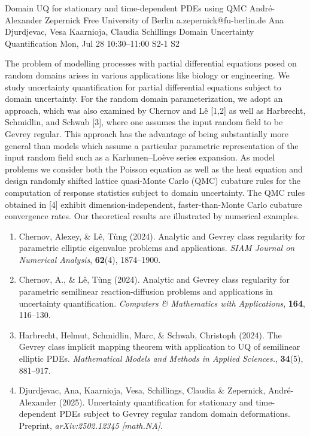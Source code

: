 \documentclass[12pt,lettersize,oneside]{book} %
\begin{document}
\begin{talk}
  {Domain UQ for stationary and time-dependent PDEs using QMC}%
  {Andr\'e-Alexander Zepernick}%
  {Free University of Berlin}%
  {a.zepernick@fu-berlin.de}%
  {Ana Djurdjevac, Vesa Kaarnioja, Claudia Schillings}%
  {Domain Uncertainty Quantification}%
  {Mon, Jul 28 10:30--11:00}%
  {S2-1}%
  {S2}%

The problem of modelling processes with partial differential equations posed on random domains arises in various applications like biology or engineering. We study uncertainty quantification for partial differential equations subject to domain uncertainty. For the random domain parameterization, we adopt an approach, which was also examined by Chernov and L\^{e} [1,2] as well as Harbrecht, Schmidlin, and Schwab [3], where one assumes the input random field to be Gevrey regular. This approach has the advantage of being substantially more general than models which assume a particular parametric representation of the input random field such as a Karhunen--Lo\`eve series expansion. As model problems we consider both the Poisson equation as well as the heat equation and design randomly shifted lattice quasi-Monte Carlo (QMC) cubature rules for the computation of response statistics subject to domain uncertainty. The QMC rules obtained in [4] exhibit dimension-independent, faster-than-Monte Carlo cubature convergence rates. Our theoretical results are illustrated by numerical examples.
\begin{enumerate}
    \item[{[1]}] Chernov, Alexey, \& L\^{e}, T\`ung (2024). Analytic and Gevrey class regularity for parametric elliptic eigenvalue problems and applications. \emph{SIAM Journal on Numerical Analysis}, \textbf{62}(4), 1874--1900.
    \item[{[2]}] Chernov, A., \& L\^{e}, T\`ung (2024). Analytic and Gevrey class regularity for parametric semilinear reaction-diffusion problems and applications in uncertainty quantification. \emph{Computers \& Mathematics with Applications}, \textbf{164}, 116--130.
    \item[{[3]}] Harbrecht, Helmut, Schmidlin, Marc, \& Schwab, Christoph (2024). The Gevrey class implicit mapping theorem with application to UQ of semilinear elliptic PDEs. \emph{Mathematical Models and Methods in Applied Sciences.}, \textbf{34}(5), 881--917.
    \item[{[4]}] Djurdjevac, Ana, Kaarnioja, Vesa, Schillings, Claudia \& Zepernick, Andr\'e-Alexander (2025). Uncertainty quantification for stationary and time-dependent PDEs subject to Gevrey regular random domain deformations. Preprint, \emph{arXiv:2502.12345 [math.NA]}.
\end{enumerate}

\medskip

\end{talk}
\end{document}
